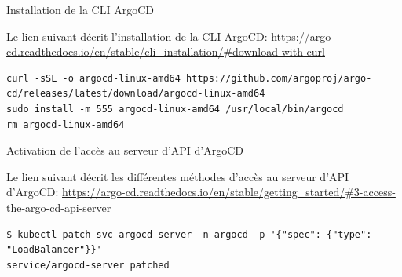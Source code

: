 
\begin{frame}[fragile]{Installation de la CLI ArgoCD}

Le lien suivant décrit l'installation de la CLI ArgoCD: \url{https://argo-cd.readthedocs.io/en/stable/cli_installation/#download-with-curl}

\begin{tiny}
\begin{Verbatim}[commandchars=\&\#\#]
curl -sSL -o argocd-linux-amd64 https://github.com/argoproj/argo-cd/releases/latest/download/argocd-linux-amd64
sudo install -m 555 argocd-linux-amd64 /usr/local/bin/argocd
rm argocd-linux-amd64
\end{Verbatim}
\end{tiny}


\end{frame}


\begin{frame}[fragile]{Activation de l'accès au serveur d'API d'ArgoCD}

Le lien suivant décrit les différentes méthodes d'accès au serveur d'API d'ArgoCD: \url{https://argo-cd.readthedocs.io/en/stable/getting_started/#3-access-the-argo-cd-api-server}

\begin{tiny}
\begin{Verbatim}[commandchars=\&\#\#]
$ kubectl patch svc argocd-server -n argocd -p '{"spec": {"type": "LoadBalancer"}}'
service/argocd-server patched
\end{Verbatim}
\end{tiny}

\end{frame}


